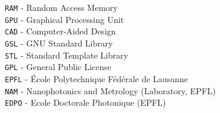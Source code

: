 \documentclass[a4paper,11pt]{article}
\begin{document}
\begin{titlepage}
\texttt{RAM} - Random Access Memory\\
\texttt{GPU} - Graphical Processing Unit\\
\texttt{CAD} - Computer-Aided Design\\
\texttt{GSL} - GNU Standard Library\\
\texttt{STL} - Standard Template Library\\
\texttt{GPL} - General Public License\\
%
\texttt{EPFL} - \'Ecole Polytechnique F\'ed\'erale de Lausanne \\
\texttt{NAM} - Nanophotonics and Metrology (Laboratory, EPFL) \\
\texttt{EDPO} - Ecole Doctorale Photonique (EPFL)\\



\pagebreak
\vfill


\end{titlepage}
\end{document}
